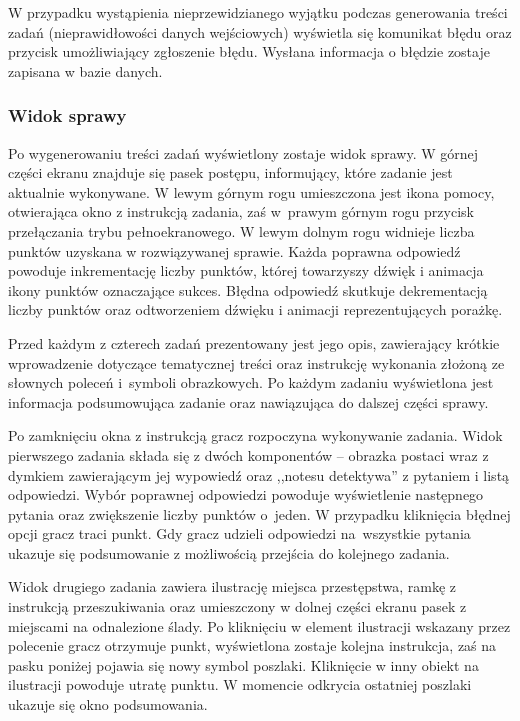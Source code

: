         W przypadku wystąpienia nieprzewidzianego wyjątku podczas generowania treści zadań (nieprawidłowości danych wejściowych) wyświetla się komunikat błędu oraz przycisk umożliwiający zgłoszenie błędu.
        Wysłana informacja o błędzie zostaje zapisana w bazie danych.
        
        \subsubsection{Widok sprawy}
        Po wygenerowaniu treści zadań wyświetlony zostaje widok sprawy.
        W górnej części ekranu znajduje się pasek postępu, informujący, które zadanie jest aktualnie wykonywane.
        W lewym górnym rogu umieszczona jest ikona pomocy, otwierająca okno z instrukcją zadania, zaś w~prawym górnym rogu przycisk przełączania trybu pełnoekranowego.
        W lewym dolnym rogu widnieje liczba punktów uzyskana w rozwiązywanej sprawie.
        Każda poprawna odpowiedź powoduje inkrementację liczby punktów, której towarzyszy dźwięk i animacja ikony punktów oznaczające sukces.
        Błędna odpowiedź skutkuje dekrementacją liczby punktów oraz odtworzeniem dźwięku i animacji reprezentujących porażkę.
        
        Przed każdym z czterech zadań prezentowany jest jego opis, zawierający krótkie wprowadzenie dotyczące tematycznej treści oraz instrukcję wykonania złożoną ze słownych poleceń i~symboli obrazkowych.
        Po każdym zadaniu wyświetlona jest informacja podsumowująca zadanie oraz nawiązująca do dalszej części sprawy.
        
        Po zamknięciu okna z instrukcją gracz rozpoczyna wykonywanie zadania.
        Widok pierwszego zadania składa się z dwóch komponentów -- obrazka postaci wraz z dymkiem zawierającym jej wypowiedź oraz ,,notesu detektywa'' z pytaniem i listą odpowiedzi.
        Wybór poprawnej odpowiedzi powoduje wyświetlenie następnego pytania oraz zwiększenie liczby punktów o~jeden.
        W przypadku kliknięcia błędnej opcji gracz traci punkt.
        Gdy gracz udzieli odpowiedzi na~wszystkie pytania ukazuje się podsumowanie z możliwością przejścia do kolejnego zadania.
        
        Widok drugiego zadania zawiera ilustrację miejsca przestępstwa, ramkę z instrukcją przeszukiwania oraz umieszczony w dolnej części ekranu pasek z miejscami na odnalezione ślady.
        Po kliknięciu w element ilustracji wskazany przez polecenie gracz otrzymuje punkt, wyświetlona zostaje kolejna instrukcja, zaś na pasku poniżej pojawia się nowy symbol poszlaki.
        Kliknięcie w inny obiekt na ilustracji powoduje utratę punktu.
        W momencie odkrycia ostatniej poszlaki ukazuje się okno podsumowania.
        
